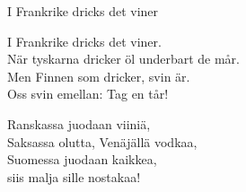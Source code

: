 \begin{song}{I Frankrike dricks det viner}
	
	
	
	I Frankrike dricks det viner.\\
	När tyskarna dricker öl underbart de mår.\\
	Men Finnen som dricker, svin är.\\
	Oss svin emellan: Tag en tår!

	Ranskassa juodaan viiniä,\\
	Saksassa olutta, Venäjällä vodkaa,\\
	Suomessa juodaan kaikkea,\\
	siis malja sille nostakaa!

\end{song}
